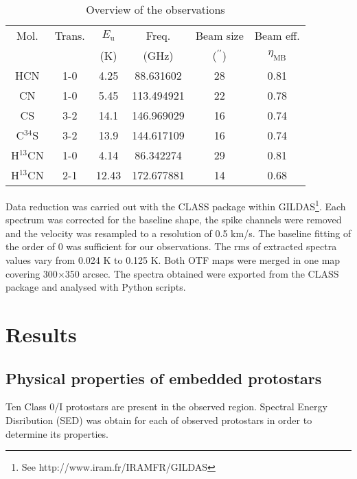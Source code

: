 \documentclass{aa}
\begin{document}
\begin{table}
\caption{Overview of the observations}             %
\label{table:1}      %
\centering                          %
\begin{tabular}{c c c c c c}        %
\hline\hline                 %
Mol. & Trans. & $E_\mathrm{u}$ & Freq. &  Beam size & Beam eff.\\
 & & (K) & (GHz) & ($^{\prime\prime}$) & $\eta_\mathrm{MB}$\\
\hline                        %
HCN & 1-0 & 4.25 & 88.631602 & 28 & 0.81\\
CN & 1-0 & 5.45 & 113.494921 & 22 & 0.78\\
CS & 3-2 & 14.1 & 146.969029 & 16 & 0.74\\
C$^{34}$S & 3-2 & 13.9 & 144.617109 & 16 & 0.74\\
H$^{13}$CN & 1-0 & 4.14 & 86.342274 & 29 & 0.81\\
H$^{13}$CN & 2-1 & 12.43 & 172.677881 & 14 & 0.68\\
\hline                                   
\end{tabular}
\end{table}

Data reduction was carried out with the CLASS package within GILDAS\footnote{See http://www.iram.fr/IRAMFR/GILDAS}. Each spectrum was corrected for the baseline shape, the spike channels were removed and the velocity was resampled to a resolution of 0.5 km/s. The baseline fitting of the order of 0 was sufficient for our observations. The rms of extracted spectra values vary from 0.024 K to 0.125 K. Both OTF maps were merged in one map covering 300$\times$350 arcsec. The spectra obtained were exported from the CLASS package and analysed with Python scripts. 


\section{Results}

\subsection{Physical properties of embedded protostars}
Ten Class 0/I protostars are present in the observed region. Spectral Energy Disribution (SED) was obtain for each of observed protostars in order to determine its properties. 
\end{document}
